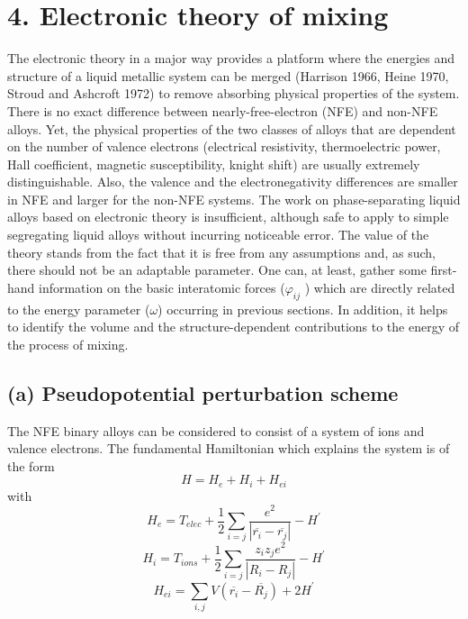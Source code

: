 \documentclass[12pt]{article}
\newcommand*{\1}{\hspace{1pt}}
\begin{document}
\section*{4. Electronic theory of mixing }

    The electronic theory in a major way provides a platform where the energies and structure of
a liquid metallic system can be merged (Harrison 1966, Heine 1970, Stroud and Ashcroft
1972) to remove absorbing physical properties of the system. 
There is no exact difference between nearly-free-electron (NFE) and non-NFE alloys. Yet, the 
physical properties of the two classes of alloys that are dependent on the number of valence 
electrons (electrical resistivity, thermoelectric power, Hall coefficient, magnetic 
susceptibility, knight shift) are usually extremely distinguishable. Also, the valence and 
the electronegativity differences are smaller in NFE and larger for the non-NFE systems.
The work on phase-separating liquid alloys based on electronic theory is insufficient,
although safe to apply to simple segregating liquid alloys without incurring noticeable error. 
The value of the theory stands from the fact that it is free from any assumptions
and, as such, there should not be an adaptable parameter. One can, at least, gather some
first-hand information on the basic interatomic forces ($\varphi  _{ij}$ ) which are directly related to the
energy parameter ($\omega $) occurring in previous sections. In addition, it helps to identify 
the volume and the structure-dependent contributions to the energy of the process of mixing.\\

\subsection*{(a) Pseudopotential perturbation scheme}

The NFE binary alloys can be considered to consist of a system of ions and valence electrons.
The fundamental Hamiltonian which explains the system is of the form\\

    \begin{equation}
        H = H_e + H_i + H_{ei}
    \end{equation}
with
    \begin{equation}
        H_e = T _{elec} + \frac{1}{2}\sum_{i = j}^{} \frac{e^2}{|\overline{r_i} - \overline{r_j}|} - H^{\prime }  
    \end{equation}
    \begin{equation}
        H_i = T_{ions} +\frac{1}{2}\sum_{i = j}^{} \frac{z_{i}z_{j}e^2}{|{R_i} - {R_j}|} - H^{\prime }  
    \end{equation}
    \begin{equation}
        H_{ei} = \sum_{i , j}^{} {V(\overline{r_i} - \overline{R_j})} + 2H^{\prime }  
    \end{equation}
\end{document}
